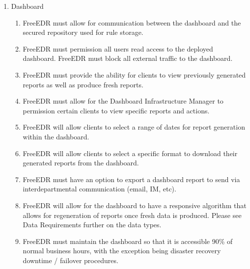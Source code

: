 \documentclass{scrreprt}
\begin{document}
\begin{enumerate}[label*=R\arabic*.]
    \item Dashboard
    \begin{enumerate}[label*=\arabic*.]
        \item  FreeEDR must allow for communication between the dashboard and the secured repository used for rule storage.
	\item FreeEDR must permission all users read access to the deployed dashboard. FreeEDR must block all external traffic to the dashboard.
\item FreeEDR must provide the ability for clients to view previously generated reports as well as produce fresh reports.
\item FreeEDR must allow for the Dashboard Infrastructure Manager to permission certain clients to view specific reports and actions. 
\item FreeEDR will allow clients to select a range of dates for report generation within the dashboard.
\item FreeEDR will allow clients to select a specific format to download their generated reports from the dashboard.
\item FreeEDR must have an option to export a dashboard report to send via interdepartmental communication (email, IM, etc).
\item FreeEDR will allow for the dashboard to have a responsive algorithm that allows for regeneration of reports once fresh data is produced. Please see Data Requirements further on the data types.
\item FreeEDR must maintain the dashboard so that it is accessible 90\% of normal business hours, with the exception being disaster recovery downtime / failover procedures.
    \end{enumerate}
\end{enumerate}
\end{document}
